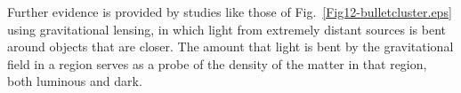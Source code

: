 \documentclass[12pt]{iopart}
\begin{document}
Further evidence is provided by studies like those of Fig.~\ref{Fig12-bulletcluster.eps} using gravitational lensing, in which light from extremely distant sources is bent around objects that are closer. The amount that light is bent by the gravitational field in a region serves as a probe of the density of the matter in that region, both luminous and dark.
\end{document}
